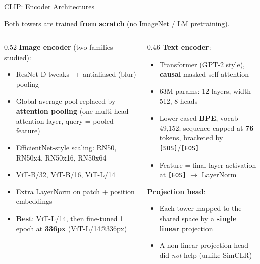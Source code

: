 \begin{frame}{CLIP: Encoder Architectures}

  Both towers are trained \textbf{from scratch} (no ImageNet / LM pretraining).

  \vspace{0.3em}
  \begin{columns}
    \begin{column}{0.52\textwidth}
      \textbf{Image encoder} (two families studied):
      \begin{description}[style=nextline, leftmargin=0.6em]
        \item[Modified ResNet]
          \begin{itemize}
            \item ResNet-D tweaks~\cite{he2019bagoftricks} + antialiased (blur) pooling
            \item Global average pool replaced by \textbf{attention pooling} (one multi-head attention layer, query = pooled feature)
            \item EfficientNet-style scaling: RN50, RN50x4, RN50x16, RN50x64
          \end{itemize}
        \item[Vision Transformer]
          \begin{itemize}
            \item ViT-B/32, ViT-B/16, ViT-L/14
            \item Extra LayerNorm on patch + position embeddings
            \item \textbf{Best}: ViT-L/14, then fine-tuned 1 epoch at \textbf{336px} (ViT-L/14@336px)
          \end{itemize}
      \end{description}
    \end{column}
    \begin{column}{0.46\textwidth}
      \textbf{Text encoder}:
      \begin{itemize}
        \item Transformer (GPT-2 style), \textbf{causal} masked self-attention
        \item 63M params: 12 layers, width 512, 8 heads
        \item Lower-cased \textbf{BPE}, vocab 49{,}152; sequence capped at \textbf{76} tokens, bracketed by \texttt{[SOS]}/\texttt{[EOS]}
        \item Feature = final-layer activation at \texttt{[EOS]} $\to$ LayerNorm
      \end{itemize}

      \vspace{0.4em}
      \textbf{Projection head}:
      \begin{itemize}
        \item Each tower mapped to the shared space by a \textbf{single linear} projection
        \item A non-linear projection head did \emph{not} help (unlike SimCLR)
      \end{itemize}
    \end{column}
  \end{columns}
\end{frame}

